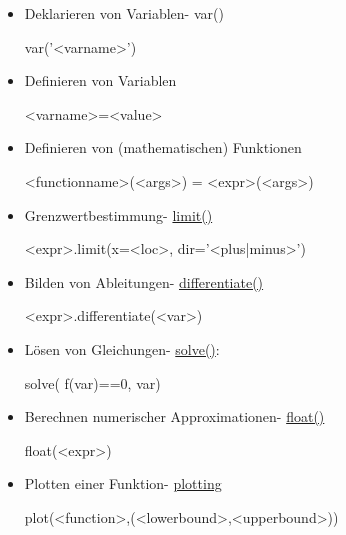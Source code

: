 \documentclass[a4paper,9pt,DIV15,twocolumn]{scrartcl}
\begin{document}
\begin{itemize}
 \item Deklarieren von Variablen- var()%
\begin{sagein}
var('<varname>')
\end{sagein}
\item Definieren von Variablen 
    \begin{sagein}
<varname>=<value>        
    \end{sagein}
\item Definieren von (mathematischen) Funktionen 
    \begin{sagein}
<functionname>(<args>) = <expr>(<args>)
    \end{sagein}
\item Grenzwertbestimmung- \href{https://sage.math.uni-goettingen.de/doc/static/reference/sage/calculus/functional.html?highlight=function#sage.calculus.functional.limit}{limit()}
    \begin{sagein}
<expr>.limit(x=<loc>, dir='<plus|minus>')
    \end{sagein}
\item Bilden von Ableitungen- \href{https://sage.math.uni-goettingen.de/doc/static/reference/sage/symbolic/expression.html?highlight=differentiate#sage.symbolic.expression.Expression.differentiate}{differentiate()}
\begin{sagein}
<expr>.differentiate(<var>)
\end{sagein}

\item Lösen von Gleichungen- \href{https://sage.math.uni-goettingen.de/doc/static/reference/sage/symbolic/relation.html?highlight=symbolic.relation#sage.symbolic.relation.solve}{solve()}:
\begin{sagein}
solve( f(var)==0, var)
\end{sagein}
\item Berechnen numerischer Approximationen- \href{http://docs.python.org/library/functions.html#float}{float()}
\begin{sagein}
float(<expr>)
\end{sagein}
\item Plotten einer Funktion- \href{https://sage.math.uni-goettingen.de/doc/static/reference/sage/plot/plot.html?highlight=.plot#d-plotting}{plotting}
\begin{sagein}
plot(<function>,(<lowerbound>,<upperbound>))
\end{sagein}
\end{itemize}
\end{document}
